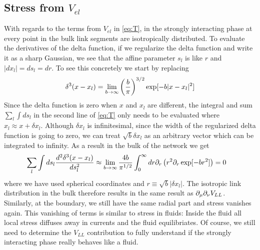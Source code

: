 \documentclass[nofootinbib,preprint,floatfix,titlepage,endfloats,superscriptaddress]{revtex4} %
\begin{document}
\subsection{Stress from $V_{el}$}
With regards to the terms from $V_{el}$ in \eqref{eq:T}, in the strongly interacting phase at every point in the bulk link segments are isotropically distributed. 
To evaluate the derivatives of the delta function, if we regularize the delta function and write it as a sharp Gaussian, we see that the affine parameter $s_l$ is like $r$ and $|dx_l|= ds_l = dr$. 
To see this concretely we start by replacing
\[\delta^3(x-x_l) = \lim_{b\to \infty } \left({b \over\pi}\right)^{3/2} \exp[-b|x-x_l|^2]\]
Since the delta function is zero when $x$ and $x_l$ are different, the integral and sum $\sum_l\int ds_l$ in the second line of \eqref{eq:T} only needs to be evaluated where $x_l \approx x+\delta x_l $. 
Although $\delta x_l$ is infinitesimal, since the width of the regularized delta function is going to zero, we can treat $\sqrt{b}\delta x_l$ as an arbitrary vector which can be integrated to infinity. 
As a result in the bulk of the network we get 
\begin{align}\sum_l\int ds_l {d^2 \delta^3(x-x_l)\over ds_l^2} & \approx 
    \lim_{b\to \infty } {4b \over \pi^{1/2}} \int_0^\infty d r {\partial_r} \left(r^2 \partial_r \exp[-br^2]\right) = 0 
\end{align}
where we have used spherical coordinates and $r \equiv \sqrt{b} | \delta x_l| $.
The isotropic link distribution in the bulk therefore results in the same result as $  \partial_\mu \partial_\nu V_{LL}$.
Similarly, at the boundary, we still have the same radial part and stress vanishes again. 
This vanishing of terms is similar to stress in fluids: Inside the fluid all local stress diffuses away in currents and the fluid equilibriates. 
Of course, we still need to determine the $V_{LL}$ contribution to fully understand if the strongly interacting phase really behaves like a fluid. 
\end{document}
